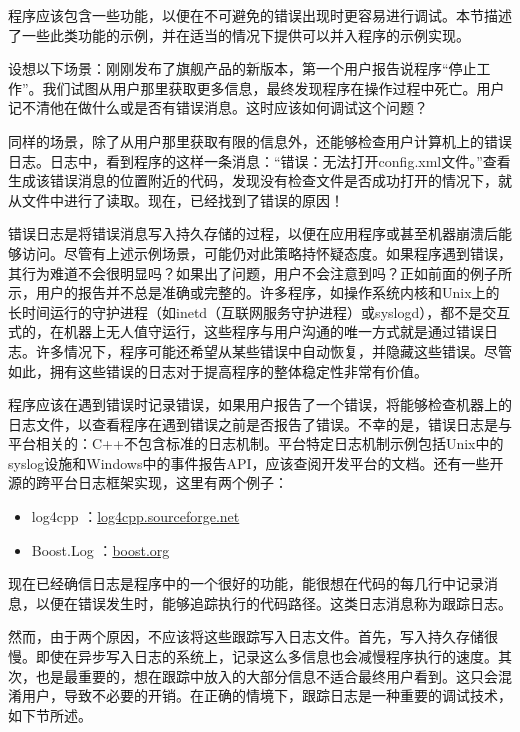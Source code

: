 
程序应该包含一些功能，以便在不可避免的错误出现时更容易进行调试。本节描述了一些此类功能的示例，并在适当的情况下提供可以并入程序的示例实现。


设想以下场景：刚刚发布了旗舰产品的新版本，第一个用户报告说程序“停止工作”。我们试图从用户那里获取更多信息，最终发现程序在操作过程中死亡。用户记不清他在做什么或是否有错误消息。这时应该如何调试这个问题？

同样的场景，除了从用户那里获取有限的信息外，还能够检查用户计算机上的错误日志。日志中，看到程序的这样一条消息：“错误：无法打开config.xml文件。”查看生成该错误消息的位置附近的代码，发现没有检查文件是否成功打开的情况下，就从文件中进行了读取。现在，已经找到了错误的原因！

错误日志是将错误消息写入持久存储的过程，以便在应用程序或甚至机器崩溃后能够访问。尽管有上述示例场景，可能仍对此策略持怀疑态度。如果程序遇到错误，其行为难道不会很明显吗？如果出了问题，用户不会注意到吗？正如前面的例子所示，用户的报告并不总是准确或完整的。许多程序，如操作系统内核和Unix上的长时间运行的守护进程（如inetd（互联网服务守护进程）或syslogd），都不是交互式的，在机器上无人值守运行，这些程序与用户沟通的唯一方式就是通过错误日志。许多情况下，程序可能还希望从某些错误中自动恢复，并隐藏这些错误。尽管如此，拥有这些错误的日志对于提高程序的整体稳定性非常有价值。

程序应该在遇到错误时记录错误，如果用户报告了一个错误，将能够检查机器上的日志文件，以查看程序在遇到错误之前是否报告了错误。不幸的是，错误日志是与平台相关的：C++不包含标准的日志机制。平台特定日志机制示例包括Unix中的syslog设施和Windows中的事件报告API，应该查阅开发平台的文档。还有一些开源的跨平台日志框架实现，这里有两个例子：

\begin{itemize}
\item
log4cpp ：\url{log4cpp.sourceforge.net}

\item
Boost.Log ：\url{boost.org}
\end{itemize}

现在已经确信日志是程序中的一个很好的功能，能很想在代码的每几行中记录消息，以便在错误发生时，能够追踪执行的代码路径。这类日志消息称为跟踪日志。

然而，由于两个原因，不应该将这些跟踪写入日志文件。首先，写入持久存储很慢。即使在异步写入日志的系统上，记录这么多信息也会减慢程序执行的速度。其次，也是最重要的，想在跟踪中放入的大部分信息不适合最终用户看到。这只会混淆用户，导致不必要的开销。在正确的情境下，跟踪日志是一种重要的调试技术，如下节所述。

